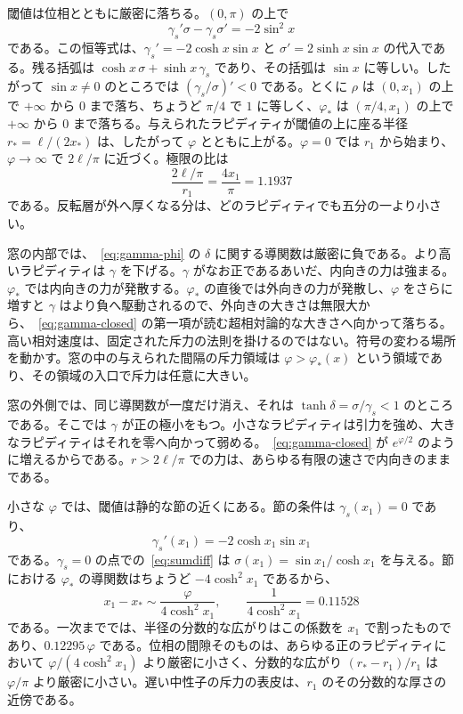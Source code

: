 \documentclass[a4paper]{article}
\begin{document}
閾値は位相とともに厳密に落ちる。\((0,\pi)\) の上で
\begin{equation}
\label{eq:rho-derivative}
\gamma_s'\sigma-\gamma_s\sigma'
  =-2\sin^{2}x
\end{equation}
である。この恒等式は、\(\gamma_s'=-2\cosh x\sin x\) と \(\sigma'=2\sinh x\sin x\) の代入である。残る括弧は \(\cosh x\,\sigma+\sinh x\,\gamma_s\) であり、その括弧は \(\sin x\) に等しい。したがって \(\sin x\neq 0\) のところでは \((\gamma_s/\sigma)'<0\) である。とくに \(\rho\) は \((0,x_1)\) の上で \(+\infty\) から \(0\) まで落ち、ちょうど \(\pi/4\) で \(1\) に等しく、\(\varphi_*\) は \((\pi/4,x_1)\) の上で \(+\infty\) から \(0\) まで落ちる。与えられたラピディティが閾値の上に座る半径 \(r_*=\ell/(2x_*)\) は、したがって \(\varphi\) とともに上がる。\(\varphi=0\) では \(r_1\) から始まり、\(\varphi\to\infty\) で \(2\ell/\pi\) に近づく。極限の比は
\begin{equation}
\label{eq:limit-ratio}
\frac{2\ell/\pi}{r_1}=\frac{4x_1}{\pi}=1.1937
\end{equation}
である。反転層が外へ厚くなる分は、どのラピディティでも五分の一より小さい。

窓の内部では、~\eqref{eq:gamma-phi} の \(\delta\) に関する導関数は厳密に負である。より高いラピディティは \(\gamma\) を下げる。\(\gamma\) がなお正であるあいだ、内向きの力は強まる。\(\varphi_*\) では内向きの力が発散する。\(\varphi_*\) の直後では外向きの力が発散し、\(\varphi\) をさらに増すと \(\gamma\) はより負へ駆動されるので、外向きの大きさは無限大から、~\eqref{eq:gamma-closed} の第一項が読む超相対論的な大きさへ向かって落ちる。高い相対速度は、固定された斥力の法則を掛けるのではない。符号の変わる場所を動かす。窓の中の与えられた間隔の斥力領域は \(\varphi>\varphi_*(x)\) という領域であり、その領域の入口で斥力は任意に大きい。

窓の外側では、同じ導関数が一度だけ消え、それは \(\tanh\delta=\sigma/\gamma_s<1\) のところである。そこでは \(\gamma\) が正の極小をもつ。小さなラピディティは引力を強め、大きなラピディティはそれを零へ向かって弱める。~\eqref{eq:gamma-closed} が \(e^{\varphi/2}\) のように増えるからである。\(r>2\ell/\pi\) での力は、あらゆる有限の速さで内向きのままである。

小さな \(\varphi\) では、閾値は静的な節の近くにある。節の条件は \(\gamma_s(x_1)=0\) であり、
\[
\gamma_s'(x_1)=-2\cosh x_1\sin x_1
\]
である。\(\gamma_s=0\) の点での~\eqref{eq:sumdiff} は \(\sigma(x_1)=\sin x_1/\cosh x_1\) を与える。節における \(\varphi_*\) の導関数はちょうど \(-4\cosh^{2}x_1\) であるから、
\begin{equation}
\label{eq:skin}
x_1-x_*
  \sim
  \frac{\varphi}{4\cosh^{2}x_1},
\qquad
\frac{1}{4\cosh^{2}x_1}=0.11528
\end{equation}
である。一次まででは、半径の分数的な広がりはこの係数を \(x_1\) で割ったものであり、\(0.12295\,\varphi\) である。位相の間隙そのものは、あらゆる正のラピディティにおいて \(\varphi/(4\cosh^{2}x_{1})\) より厳密に小さく、分数的な広がり \((r_{*}-r_{1})/r_{1}\) は \(\varphi/\pi\) より厳密に小さい。遅い中性子の斥力の表皮は、\(r_1\) のその分数的な厚さの近傍である。
\end{document}
